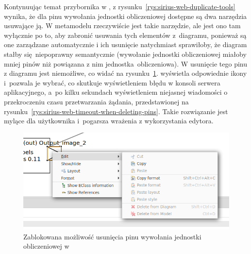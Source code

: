 Kontynuując temat przybornika w \SiriusWeb{}, z
rysunku~\ref{rys:sirius-web-duplicate-tools} wynika, że dla pinu wywołania
jednostki obliczeniowej dostępne są dwa narzędzia usuwające ją. W
metamodelu rzeczywiście jest takie narzędzie, ale jest ono tam wyłącznie po to,
aby zabronić usuwania tych elementów z~diagramu, ponieważ są one zarządzane
automatycznie i ich usunięcie natychmiast sprawiłoby, że diagram stałby
się niepoprawny semantycznie (wywołanie jednostki obliczeniowej miałoby mniej
pinów niż powiązana z nim jednostka obliczeniowa). W \SiriusDesktop{}
usunięcie tego pinu z diagramu jest niemożliwe, co widać na
rysunku~\ref{rys:sirius-desktop-blocked-deleting-pins}.
\SiriusWeb{} wyświetla odpowiednie ikony i~pozwala je wybrać, co skutkuje
wyświetleniem błędu w konsoli serwera aplikacyjnego, a~po kilku sekundach
wyświetleniem niejasnej wiadomości o przekroczeniu czasu przetwarzania żądania,
przedstawionej na rysunku~\ref{rys:sirius-web-timeout-when-deleting-pins}.
Takie rozwiązanie jest mylące dla użytkownika i~pogarsza wrażenia z
wykorzystania edytora.

\begin{figure}[!ht]
  \centering

  \includegraphics[width=0.95\linewidth]{./images/sirius-desktop-blocked-deleting-pins.png}
  \caption{Zablokowana możliwość usunięcia pinu wywołania jednostki
    obliczeniowej w \SiriusDesktop{}}\label{rys:sirius-desktop-blocked-deleting-pins}
\end{figure}

